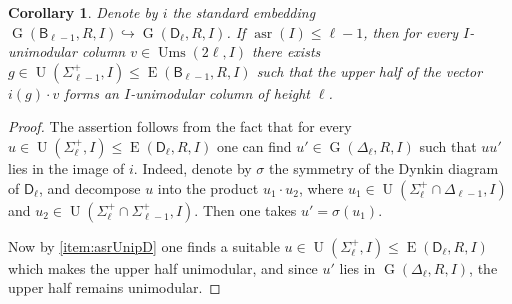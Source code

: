 \documentclass[oneside, 12pt]{amsart}
\theoremstyle{plain}
\numberwithin{equation}{section}
\numberwithin{lemma}{section}
\newtheorem{cor}[lemma]{Corollary}
\theoremstyle{definition}
\theoremstyle{remark}
\DeclareMathOperator{\G}{G}
\DeclareMathOperator{\E}{E}
\DeclareMathOperator{\U}{U}
\DeclareMathOperator{\asr}{asr}
\DeclareMathOperator{\Ums}{Ums}
\newcommand{\rB}{\mathsf{B}}
\newcommand{\rD}{\mathsf{D}}
\begin{document}
\begin{cor} \label{cor:embeddingBD}
 Denote by $i$ the standard embedding $\G(\rB_{\ell-1}, R, I) \hookrightarrow \G(\rD_\ell, R, I)$. 
 If $\asr(I) \leqslant \ell-1$, then for every $I$-unimodular column $v \in \Ums(2\ell, I)$ there exists $g \in \U(\Sigma_{\ell-1}^+, I) \leqslant \E(\rB_{\ell-1}, R, I)$ such that
 the upper half of the vector $i(g) \cdot v$ forms an $I$-unimodular column of height $\ell$.
\end{cor}
\begin{proof}
 The assertion follows from the fact that for every $u \in \U(\Sigma_\ell^+, I) \leqslant \E(\rD_\ell, R, I)$ one can find $u' \in \G(\Delta_\ell, R, I)$ such that $uu'$ lies in the image of $i$. 
 Indeed, denote by $\sigma$ the symmetry of the Dynkin diagram of $\rD_\ell$,
 and decompose $u$ into the product $u_1 \cdot u_2$, where $u_1 \in \U(\Sigma_\ell^+\cap\Delta_{\ell-1}, I)$ and $u_2 \in \U(\Sigma_\ell^+ \cap \Sigma_{\ell-1}^+, I)$.
 Then one takes $u' = \sigma(u_1)$.

 Now by \cref{item:asrUnipD} one finds a suitable $u \in \U(\Sigma_\ell^+, I) \leqslant \E(\rD_\ell, R, I)$ which makes the upper half unimodular,
 and since $u'$ lies in $\G(\Delta_\ell, R, I)$, the upper half remains unimodular.
\end{proof}
\end{document}
